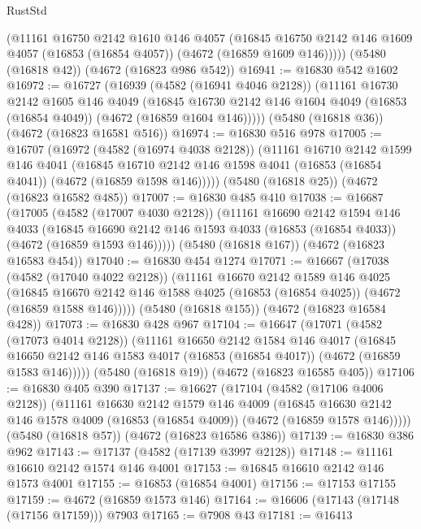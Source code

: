 \begin{lexlean}{RustStd}
\begin{coremodule}
      (@11161
        @16750
        @2142
        @1610
        @146
        @4057
        (@16845 @16750 @2142 @146 @1609 @4057 (@16853 (@16854 @4057)) (@4672 (@16859 @1609 @146)))))
    (@5480 (@16818 @42))
    (@4672 (@16823 @986 @542))
@16941 := @16830 @542 @1602
@16972 := @16727
    (@16939
      (@4582 (@16941 @4046 @2128))
      (@11161
        @16730
        @2142
        @1605
        @146
        @4049
        (@16845 @16730 @2142 @146 @1604 @4049 (@16853 (@16854 @4049)) (@4672 (@16859 @1604 @146)))))
    (@5480 (@16818 @36))
    (@4672 (@16823 @16581 @516))
@16974 := @16830 @516 @978
@17005 := @16707
    (@16972
      (@4582 (@16974 @4038 @2128))
      (@11161
        @16710
        @2142
        @1599
        @146
        @4041
        (@16845 @16710 @2142 @146 @1598 @4041 (@16853 (@16854 @4041)) (@4672 (@16859 @1598 @146)))))
    (@5480 (@16818 @25))
    (@4672 (@16823 @16582 @485))
@17007 := @16830 @485 @410
@17038 := @16687
    (@17005
      (@4582 (@17007 @4030 @2128))
      (@11161
        @16690
        @2142
        @1594
        @146
        @4033
        (@16845 @16690 @2142 @146 @1593 @4033 (@16853 (@16854 @4033)) (@4672 (@16859 @1593 @146)))))
    (@5480 (@16818 @167))
    (@4672 (@16823 @16583 @454))
@17040 := @16830 @454 @1274
@17071 := @16667
    (@17038
      (@4582 (@17040 @4022 @2128))
      (@11161
        @16670
        @2142
        @1589
        @146
        @4025
        (@16845 @16670 @2142 @146 @1588 @4025 (@16853 (@16854 @4025)) (@4672 (@16859 @1588 @146)))))
    (@5480 (@16818 @155))
    (@4672 (@16823 @16584 @428))
@17073 := @16830 @428 @967
@17104 := @16647
    (@17071
      (@4582 (@17073 @4014 @2128))
      (@11161
        @16650
        @2142
        @1584
        @146
        @4017
        (@16845 @16650 @2142 @146 @1583 @4017 (@16853 (@16854 @4017)) (@4672 (@16859 @1583 @146)))))
    (@5480 (@16818 @19))
    (@4672 (@16823 @16585 @405))
@17106 := @16830 @405 @390
@17137 := @16627
    (@17104
      (@4582 (@17106 @4006 @2128))
      (@11161
        @16630
        @2142
        @1579
        @146
        @4009
        (@16845 @16630 @2142 @146 @1578 @4009 (@16853 (@16854 @4009)) (@4672 (@16859 @1578 @146)))))
    (@5480 (@16818 @57))
    (@4672 (@16823 @16586 @386))
@17139 := @16830 @386 @962
@17143 := @17137 (@4582 (@17139 @3997 @2128))
@17148 := @11161 @16610 @2142 @1574 @146 @4001
@17153 := @16845 @16610 @2142 @146 @1573 @4001
@17155 := @16853 (@16854 @4001)
@17156 := @17153 @17155
@17159 := @4672 (@16859 @1573 @146)
@17164 := @16606 (@17143 (@17148 (@17156 @17159))) @7903
@17165 := @7908 @43
@17181 := @16413

\end{coremodule}
\end{lexlean}
